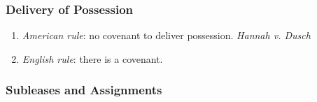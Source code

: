 \subsubsection{Delivery of Possession}

\begin{enumerate}
    \item \emph{American rule}: no covenant to deliver possession.  
    \emph{Hannah v. Dusch}
    \item \emph{English rule}: there is a covenant.
\end{enumerate}

\subsubsection{Subleases and Assignments}

